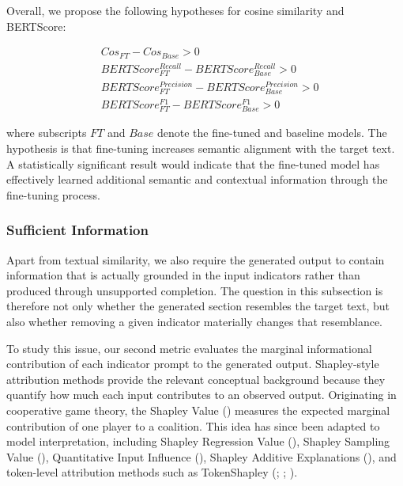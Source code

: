Overall, we propose the following hypotheses for cosine similarity and BERTScore:

\begin{equation*}
    \begin{split}
        &Cos_{FT} - Cos_{Base} > 0 \\
        &BERTScore^{Recall}_{FT} - BERTScore^{Recall}_{Base} > 0 \\
        &BERTScore^{Precision}_{FT} - BERTScore^{Precision}_{Base} > 0\\
        &BERTScore^{F1}_{FT} - BERTScore^{F1}_{Base} > 0
    \end{split}
\end{equation*}


where subscripts $FT$ and $Base$ denote the fine-tuned and baseline models. The hypothesis is that fine-tuning increases semantic alignment with the target text. A statistically significant result would indicate that the fine-tuned model has effectively learned additional semantic and contextual information through the fine-tuning process.




\subsubsection*{Sufficient Information}

Apart from textual similarity, we also require the generated output to contain information that is actually grounded in the input indicators rather than produced through unsupported completion. The question in this subsection is therefore not only whether the generated section resembles the target text, but also whether removing a given indicator materially changes that resemblance.


To study this issue, our second metric evaluates the marginal informational contribution of each indicator prompt to the generated output. Shapley-style attribution methods provide the relevant conceptual background because they quantify how much each input contributes to an observed output. Originating in cooperative game theory, the Shapley Value (\cite{shapley1953value}) measures the expected marginal contribution of one player to a coalition. This idea has since been adapted to model interpretation, including Shapley Regression Value (\cite{lipovetsky2001analysis}), Shapley Sampling Value (\cite{vstrumbelj2014explaining}), Quantitative Input Influence (\cite{datta2016algorithmic}), Shapley Additive Explanations (\cite{lundberg2017unified}), and token-level attribution methods such as TokenShapley (\cite{liu2023prompt}; \cite{mohammadi2024wait}; \cite{goldshmidt2024tokenshap}).




